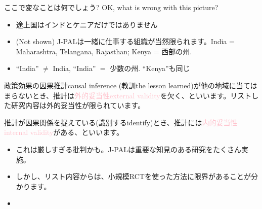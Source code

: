 \begin{frame}{}
ここで変なことは何でしょう? OK, what is wrong with this picture?
\pause
\begin{itemize}
\vspace{1.0ex}\setlength{\itemsep}{1.0ex}\setlength{\baselineskip}{12pt}
\item	途上国はインドとケニアだけではありません
\item	(Not shown) J-PALは一緒に仕事する組織が当然限られます。India = Maharashtra, Telangana, Rajasthan; Kenya = 西部の州.
\item	``India'' $\neq$ India, ``India'' $=$ 少数の州. ``Kenya''も同じ
\end{itemize}
\pause
\begin{dinglist}{43}
\vspace{1.0ex}\setlength{\itemsep}{1.0ex}\setlength{\baselineskip}{12pt}
\item	政策効果の因果推計causal inference (教訓the lesson learned)が他の地域に当てはまらないとき、推計は\textcolor{pink}{外的妥当性external validity}を欠く、といいます。リストした研究内容は外的妥当性が限られています。 
\item	推計が因果関係を捉えている(識別するidentify)とき、推計には\textcolor{pink}{内的妥当性internal validity}がある、といいます。
\end{dinglist}
\pause
\begin{itemize}
\vspace{1.0ex}\setlength{\itemsep}{1.0ex}\setlength{\baselineskip}{12pt}
\item	これは厳しすぎる批判かも。J-PALは重要な知見のある研究をたくさん実施。
\item	しかし、リスト内容からは、小規模RCTを使った方法に限界があることが分かります。
\item	 {} 
\end{itemize}
\end{frame}

